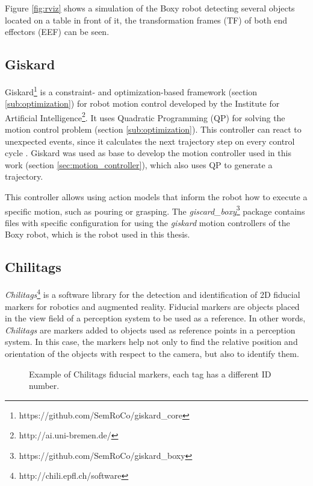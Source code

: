 Figure \ref{fig:rviz} shows a simulation of the Boxy robot detecting several objects located on a table in front of it, the transformation frames (TF) of both end effectors (EEF) can be seen.

\subsection{Giskard}
\label{subsec:giskard}
Giskard\footnote{https://github.com/SemRoCo/giskard\_core} is a constraint- and optimization-based framework (section \ref{sub:optimization}) for robot motion control developed by the Institute for Artificial Intelligence\footnote{http://ai.uni-bremen.de/}. It uses Quadratic Programming (QP)  for solving the motion control problem (section \ref{sub:optimization}). This controller can react to unexpected events, since it calculates the next trajectory step on every control cycle \citep{giskard}.  Giskard was used as base to develop the motion controller used in this work (section \ref{sec:motion_controller}), which also uses QP to generate a trajectory.

This controller allows using action models that inform the robot how to execute a specific motion, such as pouring or grasping. The \textit{giscard\_boxy}\footnote{https://github.com/SemRoCo/giskard\_boxy} package contains files with specific configuration for using the \textit{giskard} motion controllers of the Boxy robot, which is the robot used in this thesis.

\subsection{Chilitags}
\label{subsec:chili}

\textit{Chilitags}\footnote{http://chili.epfl.ch/software} is a software library for the detection and identification of 2D fiducial markers for robotics and augmented reality. Fiducial markers are objects placed in the view field of a perception system to be used as a reference. In other words, \textit{Chilitags} are markers added to objects used as reference points in a perception system. In this case, the markers help not only to find the relative position and orientation of the objects with respect to the camera, but also to identify them.
\begin{figure}[H]
	\centering \vspace{-10pt}
	\begin{subfigure}[][Tag 0]
		{\texttt{[image: 0.png]}}
	\end{subfigure}
	\begin{subfigure}[][Tag 1]
		{\texttt{[image: 1.png]}}
	\end{subfigure}
	\begin{subfigure}[][Tag 2]
		{\texttt{[image: 2.png]}}
	\end{subfigure}
	\vspace{-10pt}
	\caption[Example of Chilitags fiducial markers]{Example of Chilitags fiducial markers, each tag has a different ID number.}
	\vspace{-10pt}
	\label{fig:chilitag}
\end{figure}

